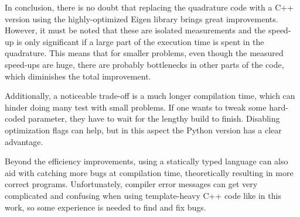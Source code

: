 In conclusion, there is no doubt that replacing the quadrature code with a C++
version using the highly-optimized Eigen library brings great improvements.
However, it must be noted that these are isolated measurements and the speed-up
is only significant if a large part of the execution time is spent in the
quadrature.
This means that for smaller problems, even though the measured speed-ups are
huge, there are probably bottlenecks in other parts of the code, which
diminishes the total improvement.

Additionally, a noticeable trade-off is a much longer compilation time, which
can hinder doing many test with small problems.
If one wants to tweak some hard-coded parameter, they have to wait for the
lengthy build to finish.
Disabling optimization flags can help, but in this aspect the Python version has
a clear advantage.

Beyond the efficiency improvements, using a statically typed language can also
aid with catching more bugs at compilation time, theoretically resulting in more
correct programs.
Unfortunately, compiler error messages can get very complicated and confusing
when using template-heavy C++ code like in this work, so some experience is
needed to find and fix bugs.

